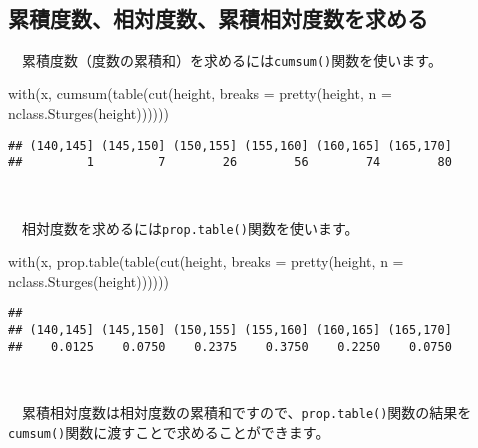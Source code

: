 \documentclass[
  12pt,
]{book}
\newenvironment{Shaded}{\begin{snugshade}}{\end{snugshade}}
\newcommand{\AttributeTok}[1]{\textcolor[rgb]{0.77,0.63,0.00}{#1}}
\newcommand{\FunctionTok}[1]{\textcolor[rgb]{0.00,0.00,0.00}{#1}}
\newcommand{\NormalTok}[1]{#1}
\begin{document}
　

\hypertarget{ux7d2fux7a4dux5ea6ux6570ux76f8ux5bfeux5ea6ux6570ux7d2fux7a4dux76f8ux5bfeux5ea6ux6570ux3092ux6c42ux3081ux308b}{%
\subsection{累積度数、相対度数、累積相対度数を求める}\label{ux7d2fux7a4dux5ea6ux6570ux76f8ux5bfeux5ea6ux6570ux7d2fux7a4dux76f8ux5bfeux5ea6ux6570ux3092ux6c42ux3081ux308b}}

　累積度数（度数の累積和）を求めるには\texttt{cumsum()}関数を使います。

\begin{Shaded}
\begin{Highlighting}[]
\FunctionTok{with}\NormalTok{(x, }\FunctionTok{cumsum}\NormalTok{(}\FunctionTok{table}\NormalTok{(}\FunctionTok{cut}\NormalTok{(height, }\AttributeTok{breaks =} \FunctionTok{pretty}\NormalTok{(height, }\AttributeTok{n =} \FunctionTok{nclass.Sturges}\NormalTok{(height))))))}
\end{Highlighting}
\end{Shaded}

\begin{verbatim}
## (140,145] (145,150] (150,155] (155,160] (160,165] (165,170] 
##         1         7        26        56        74        80
\end{verbatim}

　

　相対度数を求めるには\texttt{prop.table()}関数を使います。

\begin{Shaded}
\begin{Highlighting}[]
\FunctionTok{with}\NormalTok{(x, }\FunctionTok{prop.table}\NormalTok{(}\FunctionTok{table}\NormalTok{(}\FunctionTok{cut}\NormalTok{(height, }\AttributeTok{breaks =} \FunctionTok{pretty}\NormalTok{(height, }\AttributeTok{n =} \FunctionTok{nclass.Sturges}\NormalTok{(height))))))}
\end{Highlighting}
\end{Shaded}

\begin{verbatim}
## 
## (140,145] (145,150] (150,155] (155,160] (160,165] (165,170] 
##    0.0125    0.0750    0.2375    0.3750    0.2250    0.0750
\end{verbatim}

　

　累積相対度数は相対度数の累積和ですので、\texttt{prop.table()}関数の結果を\texttt{cumsum()}関数に渡すことで求めることができます。
\end{document}
